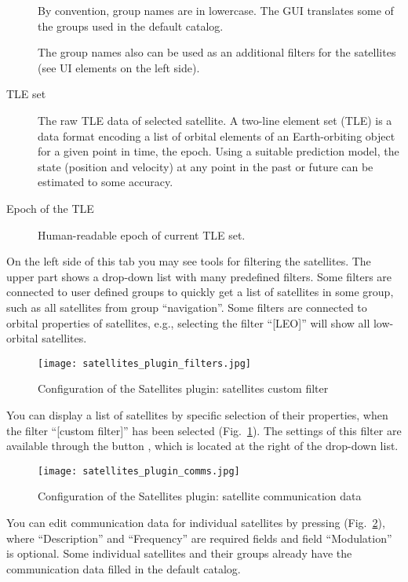 \begin{description}
By convention, group names are in lowercase. The GUI translates some of the groups used in the default catalog.

The group names also can be used as an additional filters for the satellites (see UI elements on the left side).

\item[TLE set] The raw TLE data of selected satellite. A two-line
  element set (TLE) is a data format encoding a list of orbital
  elements of an Earth-orbiting object for a given point in time, the
  epoch. Using a suitable prediction model, the state (position and
  velocity) at any point in the past or future can be estimated to
  some accuracy.

\item[Epoch of the TLE] Human-readable epoch of current TLE set.
\end{description}

On the left side of this tab you may see tools for filtering the
satellites. The upper part shows a drop-down list with many predefined
filters. Some filters are connected to user defined groups to quickly
get a list of satellites in some group, such as all satellites from
group ``navigation''. Some filters are connected to orbital properties
of satellites, e.g., selecting the filter ``[LEO]'' will show all
low-orbital satellites.

\begin{figure}[t]
	\centering\texttt{[image: satellites\_plugin\_filters.jpg]}
	\caption{Configuration of the Satellites plugin: satellites custom filter}
	\label{fig:plugins:Satellites:Configuration:SatellitesFilter}
\end{figure}

You can display  a list of satellites by specific
selection of their properties, when the filter ``[custom filter]'' has
been selected (Fig.~\ref{fig:plugins:Satellites:Configuration:SatellitesFilter}). The
settings of this filter are available through the button
, which is located at the right of
the drop-down list.

\begin{figure}[tb]
	\centering\texttt{[image: satellites\_plugin\_comms.jpg]}
	\caption{Configuration of the Satellites plugin: satellite communication data}
	\label{fig:plugins:Satellites:Configuration:SatellitesComms}
\end{figure}

You can edit communication data for individual satellites by pressing 
(Fig.~\ref{fig:plugins:Satellites:Configuration:SatellitesComms}),
where ``Description'' and ``Frequency'' are required fields and field
``Modulation'' is optional. Some individual satellites and their
groups already have the communication data filled in the default
catalog.

